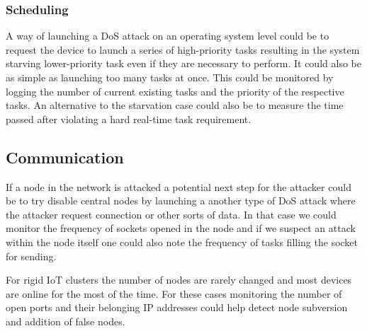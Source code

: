 \subsubsection{Scheduling}
A way of launching a DoS attack on an operating system level could be to request the device to launch a series of high-priority tasks resulting in the system starving lower-priority task even if they are necessary to perform. It could also be as simple as launching too many tasks at once. This could be monitored by logging the number of current existing tasks and the priority of the respective tasks. An alternative to the starvation case could also be to measure the time passed after violating a hard real-time task requirement. 

\subsection{Communication}
If a node in the network is attacked a potential next step for the attacker could be to try disable central nodes by launching a another type of DoS attack where the attacker request connection or other sorts of data. In that case we could monitor the frequency of sockets opened in the node and if we suspect an attack within the node itself one could also note the frequency of tasks filling the socket for sending.

For rigid IoT clusters the number of nodes are rarely changed and most devices are online for the most of the time. For these cases monitoring the number of open ports and their belonging IP addresses could help detect node subversion and addition of false nodes. 